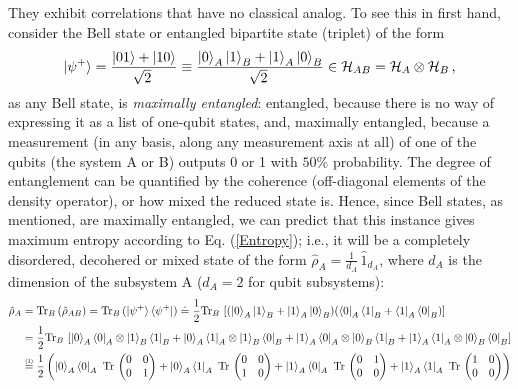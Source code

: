 \documentclass[11pt]{article}
\numberwithin{equation}{section} %
\numberwithin{figure}{section} %
\newcommand\numeq[1] %
  {\stackrel{\scriptscriptstyle(\mkern-1.5mu#1\mkern-1.5mu)}{=}}
\begin{document}
\begin{appendices}
 They exhibit correlations that have no classical analog. To see this in first hand, consider the Bell state or entangled bipartite state (triplet) of the form
\begin{equation} \label{Bell_plus_state}
\ket{\psi^+}=\frac{\ket{01}+\ket{10}}{\sqrt[]{2}}\equiv\frac{\ket{0}_A\ket{1}_B+\ket{1}_A\ket{0}_B}{\sqrt[]{2}}\in\mathcal{H}_{AB}=\mathcal{H}_A\otimes\mathcal{H}_B\,\textrm{,}
\end{equation}
as any Bell state, is \emph{maximally entangled}: entangled, because there is no way of expressing it as a list of one-qubit states, and, maximally entangled, because a measurement (in any basis, along any measurement axis at all) of one of the qubits (the system A or B) outputs 0 or 1 with $50\%$ probability. The degree of entanglement can be quantified by the coherence (off-diagonal elements of the density operator), or how mixed the reduced state is. Hence, since Bell states, as mentioned, are maximally entangled, we can predict that this instance gives maximum entropy according to Eq. (\ref{Entropy}); i.e., it will be a completely disordered, decohered or mixed state of the form $\hat{\rho}_A=\frac{1}{d_A}\,\hat{1}_{d_A}$, where $d_A$ is the dimension of the subsystem A ($d_A=2$ for qubit subsystems):
\begin{equation} \label{rho_A_entanglement}
\begin{split}
\hat{\rho}_A
&=\textrm{Tr}_B\,(\hat{\rho}_{AB})=\textrm{Tr}_B\,(\ket{\psi^+}\bra{\psi^+})\doteq\frac{1}{2}\textrm{Tr}_B\,\left[ (\ket{0}_A\ket{1}_B+\ket{1}_A\ket{0}_B)(\bra{0}_A\bra{1}_B+\bra{1}_A\bra{0}_B)\right]\\
&=\frac{1}{2}\textrm{Tr}_B\,\left[ \ket{0}_A\bra{0}_A\otimes\ket{1}_B\bra{1}_B+\ket{0}_A\bra{1}_A\otimes\ket{1}_B\bra{0}_B+\ket{1}_A\bra{0}_A\otimes\ket{0}_B\bra{1}_B+\ket{1}_A\bra{1}_A\otimes\ket{0}_B\bra{0}_B \right]\\
&\numeq{\textrm{1}}\frac{1}{2}\left( \ket{0}_A\bra{0}_A\,\,\textrm{Tr}\,\begin{pmatrix}0&0\\0&1\end{pmatrix}+\ket{0}_A\bra{1}_A\,\,\textrm{Tr}\,\begin{pmatrix}0&0\\1&0\end{pmatrix}+\ket{1}_A\bra{0}_A\,\,\textrm{Tr}\,\begin{pmatrix}0&1\\0&0\end{pmatrix}+\ket{1}_A\bra{1}_A\,\,\textrm{Tr}\,\begin{pmatrix}1&0\\0&0\end{pmatrix} \right)\\

\end{split}
\end{equation}
\end{appendices}
\end{document}
